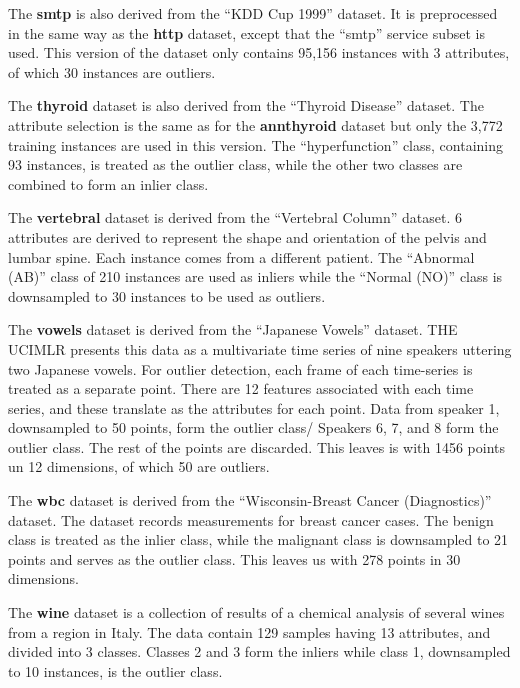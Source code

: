 The \textbf{smtp} is also derived from the ``KDD Cup 1999'' dataset.
It is preprocessed in the same way as the \textbf{http} dataset, except that the ``smtp'' service subset is used.
This version of the dataset only contains 95,156 instances with 3 attributes, of which 30 instances are outliers.

The \textbf{thyroid} dataset is also derived from the ``Thyroid Disease'' dataset.
The attribute selection is the same as for the \textbf{annthyroid} dataset but only the 3,772 training instances are used in this version.
The ``hyperfunction'' class, containing 93 instances, is treated as the outlier class, while the other two classes are combined to form an inlier class.

The \textbf{vertebral} dataset is derived from the ``Vertebral Column'' dataset.
6 attributes are derived to represent the shape and orientation of the pelvis and lumbar spine.
Each instance comes from a different patient.
The ``Abnormal (AB)'' class of 210 instances are used as inliers while the ``Normal (NO)'' class is downsampled to 30 instances to be used as outliers.

The \textbf{vowels} dataset is derived from the ``Japanese Vowels'' dataset.
THE UCIMLR presents this data as a multivariate time series of nine speakers uttering two Japanese vowels.
For outlier detection, each frame of each time-series is treated as a separate point.
There are 12 features associated with each time series, and these translate as the attributes for each point.
Data from speaker 1, downsampled to 50 points, form the outlier class/
Speakers 6, 7, and 8 form the outlier class.
The rest of the points are discarded.
This leaves is with 1456 points un 12 dimensions, of which 50 are outliers.

The \textbf{wbc} dataset is derived from the ``Wisconsin-Breast Cancer (Diagnostics)'' dataset.
The dataset records measurements for breast cancer cases.
The benign class is treated as the inlier class, while the malignant class is downsampled to 21 points and serves as the outlier class.
This leaves us with 278 points in 30 dimensions.

The \textbf{wine} dataset is a collection of results of a chemical analysis of several wines from a region in Italy.
The data contain 129 samples having 13 attributes, and divided into 3 classes.
Classes 2 and 3 form the inliers while class 1, downsampled to 10 instances, is the outlier class.
